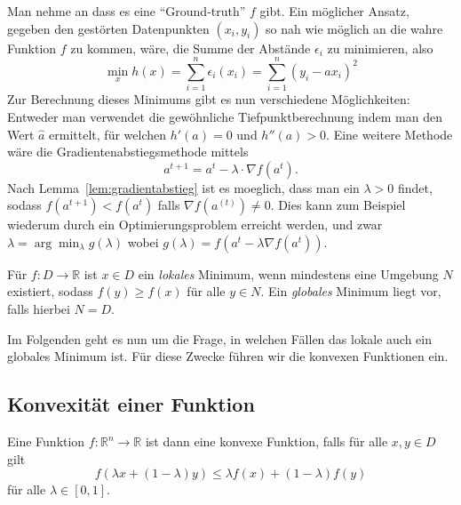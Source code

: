 Man nehme an dass es eine ``Ground-truth'' $f$ gibt.
Ein m\"oglicher Ansatz, gegeben den gest\"orten Datenpunkten $(x_i,y_i)$ so nah wie m\"oglich an die wahre Funktion $f$ zu kommen, w\"are, die Summe der Abst\"ande $\epsilon_i$ zu minimieren, also
\begin{equation*}
\min_{x} h(x)= \sum_{i=1}^n\epsilon_i(x_i) = \sum_{i=1}^n(y_i-ax_i)^2
\end{equation*}
 Zur Berechnung dieses Minimums gibt es nun verschiedene Möglichkeiten:
Entweder man verwendet die gewöhnliche Tiefpunktberechnung indem man den Wert $\hat{a}$ 
ermittelt, f\"ur welchen $h'(a)=0$ und $h''(a)>0$. 
Eine weitere Methode w\"are die Gradientenabstiegsmethode mittels
\begin{equation*}
a^{t+1}  =a^{t} - \lambda \cdot \nabla  f(a^{t}).
\end{equation*}
Nach Lemma~\ref{lem:gradientabstieg} ist es moeglich, dass man ein $\lambda > 0$ findet, sodass $f(a^{t+1}) < f(a^{t})$ falls $ \nabla f(a^{(t)}) \neq 0$. 
Dies kann zum Beispiel wiederum durch ein Optimierungsproblem erreicht werden, und zwar $\lambda=\arg\min_{\lambda} g(\lambda)$ wobei $g(\lambda)=f(a^t-\lambda\nabla f(a^t))$.



\begin{Def}
Für $f: D\rightarrow \mathbb{R}$ ist $x\in D$ ein \emph{lokales} Minimum, wenn mindestens eine Umgebung $N$ existiert, sodass $f(y)\geq f(x)$ für alle $y\in N$.
Ein \emph{globales} Minimum liegt vor, falls hierbei $N=D$.
\end{Def}

Im Folgenden geht es nun um die Frage, in welchen F\"allen das lokale auch ein globales Minimum ist. F\"ur diese Zwecke f\"uhren wir die konvexen Funktionen ein.

\subsection{Konvexität einer Funktion}

\begin{Def}
Eine Funktion $f: \mathbb{R}^n\rightarrow\mathbb{R}$ ist dann eine konvexe Funktion, falls für alle $x, y\in D$ gilt
\begin{equation*}
  f(\lambda x+ (1 - \lambda)y) \leq \lambda f(x)+(1-\lambda)f(y)
\end{equation*}
für alle $\lambda \in [0, 1]$.
\end{Def}

